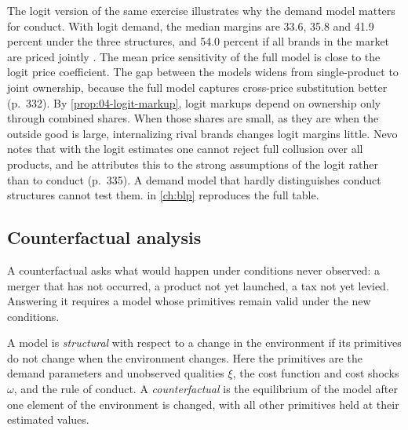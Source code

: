 The logit version of the same exercise illustrates why the demand model matters for conduct. With logit demand,
the median margins are 33.6, 35.8 and 41.9 percent under the three structures, and 54.0 percent if all brands in
the market are priced jointly \citep[Table~VIII]{Nevo2001}. The mean price sensitivity of the full model is close
to the logit price coefficient. The gap between the models widens from single-product to joint ownership, because
the full model captures cross-price substitution better (p.~332). By \cref{prop:04-logit-markup}, logit markups
depend on ownership only through combined shares. When those shares are small, as they are when the outside good is
large, internalizing rival brands changes logit margins little.
Nevo notes that with the logit estimates one cannot reject full collusion over all products, and he attributes
this to the strong assumptions of the logit rather than to conduct (p.~335). A demand model that hardly
distinguishes conduct structures cannot test them.  in \cref{ch:blp} reproduces the full
table.

\subsection{Counterfactual analysis}\label{sec:04-counterfactuals}

A counterfactual asks what would happen under conditions never observed: a merger that has not occurred, a
product not yet launched, a tax not yet levied. Answering it requires a model whose primitives remain valid under
the new conditions.

\begin{definition}\label{def:04-structural}
A model is \emph{structural} with respect to a change in the environment if its primitives do not change when the
environment changes. Here the primitives are the demand parameters and unobserved qualities $\xi$, the cost
function and cost shocks $\omega$, and the rule of conduct. A
\emph{counterfactual} is the equilibrium of the model after one element of the environment is changed, with all
other primitives held at their estimated values.
\end{definition}


